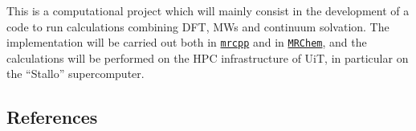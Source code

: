 \documentclass[a4paper,11pt]{article}
\newcommand{\mrchem}{\href{https://mrchem.readthedocs.io/en/latest/}{\texttt{MRChem}}}
\newcommand{\mrcpp}{\href{https://mrcpp.readthedocs.io/en/latest/}{\texttt{mrcpp}}}
\begin{document}
This is a computational project which will mainly consist in the
development of a code to run calculations combining \ac{DFT},
\acp{MW} and continuum solvation. The implementation will be carried
out both in \mrcpp{} and in \mrchem, and the calculations will be
performed on the \ac{HPC} infrastructure of UiT, in particular on the ``Stallo'' supercomputer.

\subsection*{References}
\printbibliography[heading=none]



\end{document}
